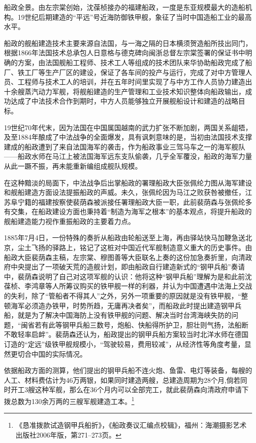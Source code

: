 \documentclass[12pt,UTF8]{ctexbook}
\begin{document}
船政全景。由左宗棠创始，沈葆桢接办的福建船政，一度是东亚规模最大的造船机构。19世纪后期建造的“平远”号近海防御铁甲舰，象征了当时中国造船工业的最高水平。

船政的舰船建造技术主要来源自法国，与一海之隔的日本横须贺造船所技出同门，根据1866年法国技术总承包人日意格与德克碑向闽浙总督左宗棠签署的保证书中明确的方案，由法国舰船工程师、技术工人等组成的技术团队来华协助船政完成了船厂、铁工厂等生产厂区的建设，保证了各车间的投产与运行，完成了对中方管理人员、工程师与技术工人的培训，并在五年时间里实现了与中方工作人员协力建造出十余艘蒸汽动力军舰，将舰船建造的生产管理和工业技术知识整体向船政输出，成功达成了中法技术合作到期时，中方人员能够独立开展舰船设计和建造的战略目标。

19世纪70年代末，因为法国在中国属国越南的武力扩张不断加剧，两国关系龃牾，及至1884年酿成了中法战争的全面爆发，具有讽刺意味的是，当初由法国技术支撑建成的船政遭到了来自法国海军的袭击，作为船政事业三驾马车之一的海军舰队——船政水师在马江上被法国海军远东支队偷袭，几乎全军覆没，船政的海军力量从此一蹶不振，再未能重新编组成舰队规模。

在这种黯淡的局面下，中法战争后出掌船政的署理船政大臣张佩纶力图从海军建设和舰船建造方面设法提振船政的声威。未久，张佩纶因为马江之败获咎被撤任，江苏阜宁籍的福建按察使裴荫森被派接任署理船政大臣一职，此前裴荫森与张佩纶多有交集，在船政建设方面也秉持着“制造为海军之根本”的基本观点，将提升船政的舰船建造能力视作重振船政的主要着力点。

1885年7月4日，一份特殊的奏折从船政由轮船送至上海，再由驿站快马加鞭急送北京，尘土飞扬的驿路上，铭记了这桩对中国近代军舰制造意义重大的历史事件。由船政大臣裴荫森主稿，左宗棠、穆图善等大臣联名上奏的这份加急奏折里，向清政府中央提出了一项破天荒的造舰计划，即由船政自行建造新式的“钢甲兵船”奏请中，裴荫森说明了自己对这项军舰的认识：他将这种“钢甲兵船”理解为是和此前沈葆桢、李鸿章等人所筹议购买的铁甲舰一样的利器，并认为中国遭遇中法海上交战的失利，除了“管船者不得其人”之外，另外一项重要的原因就是没有铁甲舰，“整顿海军必须造办铁甲，时势所趋，无庸再决者矣”，而船政此时提出建造钢甲兵船，就是为了解决中国海防上没有铁甲舰的问题、解决当时台湾海峡失防的问题，“闽省若有此等钢甲兵船三数号，炮船、快船得所护卫，胆壮则气扬，法船断不敢轻率启衅”。裴荫森还认为，船政提出的钢甲兵船方案较当时北洋水师在德国订造的“定远”级铁甲舰规模小，“驾驶较易，费用较减”，从经济性等角度考量，显然更切合中国的实际情况。

依据船政方面的测算，他们提出的钢甲兵船不连火炮、鱼雷、电灯等装备，每艘的人工、材料费估计为46万两银，如果同时建造两艘，总建造周期为28个月,倘若同时开工3艘这种军舰，那么在36个月内可以全部完工，就此裴荫森向清政府申请下拨总数为130余万两的三艘军舰建造工本。\footnote{《恳准拨款试造钢甲兵船折》，《船政奏议汇编点校辑》，福州：海潮摄影艺术出版社2006年版，第271--273页。}
\end{document}
